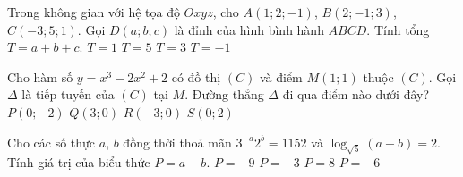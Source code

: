 	\begin{ex}%
		Trong không gian với hệ tọa độ $Oxyz$, cho $A(1;2;-1)$, $B(2;-1;3)$, $C(-3;5;1)$. Gọi $D(a; b; c)$ là đỉnh của hình bình hành $ABCD$. Tính tổng $T=a+b+c$.
		\choice
		{\True $T=1$}
		{$T=5$}
		{$T=3$}
		{$T=-1$}
	\end{ex}
	
	\begin{ex}%
		Cho hàm số $y=x^3-2x^2+2$ có đồ thị $(C)$ và điểm $M(1; 1)$ thuộc $(C)$. Gọi $\Delta$ là tiếp tuyến của $(C)$ tại $M$. Đường thẳng $\Delta$ đi qua điểm nào dưới đây?
		\choice
		{$P(0; -2)$}
		{$Q(3; 0)$}
		{$R(-3; 0)$}
		{\True $S(0; 2)$}
	\end{ex}
	
	\begin{ex}%
		Cho các số thực $a$, $b$ đồng thời thoả mãn $3^{-a}2^b=1152$ và $\log_{\sqrt{5}}\left(a+b\right)=2$. Tính giá trị của biểu thức $P=a-b$.
		\choice
		{\True $P=-9$}
		{$P=-3$}
		{$P=8$}
		{$P=-6$}
	\end{ex}
	

